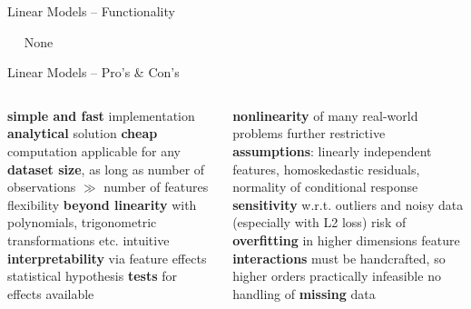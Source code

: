 \begin{vbframe}{Linear Models -- Functionality}
\medskip

 ~~ None

\medskip


\end{vbframe}


\begin{frame}{Linear Models -- Pro's \& Con's}



\begin{columns}[onlytextwidth]
  \begin{column}{0.5\textwidth}
    
    \begin{itemize}
      \positem \textbf{simple and fast} implementation
      \positem \textbf{analytical} solution
      \positem \textbf{cheap} computation
      \positem applicable for any \textbf{dataset size}, as long as number of 
      observations $\gg$ number of features
      \positem flexibility \textbf{beyond linearity} with polynomials, 
      trigonometric transformations etc.
      \positem intuitive \textbf{interpretability} via feature effects
      \positem statistical hypothesis \textbf{tests} for effects available

    \end{itemize}
  \end{column}

  \begin{column}{0.5\textwidth}
    
    \begin{itemize}
      \negitem \textbf{nonlinearity} of many real-world problems
      \negitem further restrictive \textbf{assumptions}: linearly independent 
      features, homoskedastic residuals, normality of conditional response
      \negitem \textbf{sensitivity} w.r.t. outliers and noisy data (especially 
      with L2 loss)
      \negitem risk of \textbf{overfitting} in higher dimensions
      \negitem feature \textbf{interactions} must be handcrafted, so higher
      orders practically infeasible
      \negitem no handling of \textbf{missing} data
    \end{itemize}
  \end{column}
\end{columns}

\vfill

\small


\end{frame}

